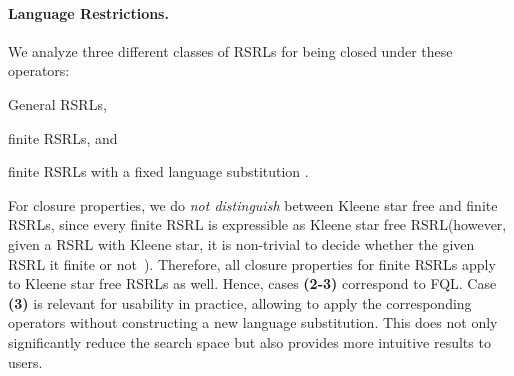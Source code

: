 \documentclass[envcountsame]{llncs}
\newcommand{\RegularlyGeneratedLanguageSetAbbrev}{RSRL\xspace}
\newcommand{\RegularlyGeneratedLanguageSetsAbbrev}{RSRLs\xspace}
\newcommand{\FQL}{FQL\xspace}
\begin{document}
\paragraph*{Language Restrictions.}
\label{sec:lang-restr}
We analyze three different classes of \RegularlyGeneratedLanguageSetsAbbrev for being closed
under these operators:
\begin{inparaenum}[\bfseries(1)]
\item General \RegularlyGeneratedLanguageSetsAbbrev,
\item finite \RegularlyGeneratedLanguageSetsAbbrev, and
\item finite \RegularlyGeneratedLanguageSetsAbbrev with a fixed
  language substitution .
\end{inparaenum}
For closure properties, we do \emph{not distinguish} between Kleene
star free and finite \RegularlyGeneratedLanguageSetsAbbrev, since
every finite \RegularlyGeneratedLanguageSetAbbrev is expressible as
Kleene star free \RegularlyGeneratedLanguageSetAbbrev (however, given
a \RegularlyGeneratedLanguageSetAbbrev with Kleene star, it is
non-trivial to decide whether the given
\RegularlyGeneratedLanguageSetAbbrev it finite or not~\cite{membership}).
Therefore, all closure properties for finite
\RegularlyGeneratedLanguageSetsAbbrev apply to Kleene star free
\RegularlyGeneratedLanguageSetsAbbrev as well.
Hence, cases {\bfseries(2-3)} correspond to \FQL.
Case {\bfseries(3)} is relevant for usability in practice, allowing to
apply the corresponding operators without constructing a new language
substitution. 
This does not only significantly reduce the search space but also
provides more intuitive results to users.
\end{document}
